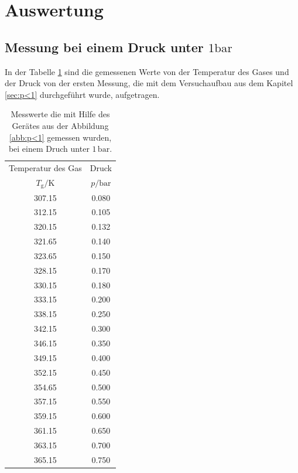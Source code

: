 \section{Auswertung}
\label{sec:Auswertung}
\subsection{Messung bei einem Druck unter $1\si{\bar}$}
In der Tabelle \ref{tab:p<1} sind die gemessenen Werte
von der Temperatur des Gases und der Druck
von der ersten Messung, die mit dem Versuchaufbau aus
dem Kapitel \ref{sec:p<1} durchgeführt wurde, aufgetragen.


\begin{table}  %
  \centering
  \caption{Messwerte die mit Hilfe des Gerätes aus der Abbildung \ref{abb:p<1} gemessen wurden, bei einem Druch unter $1\,\si{\bar}$.}
  \label{tab:p<1}
  \begin{tabular}{c c}
    \toprule
    Temperatur des Gas &  Druck \\
    $T_\mathrm{g}/ \si{\kelvin}$ & $p/\si{\bar} $ \\
    \midrule
    307.15 & 0.080\\
    312.15 & 0.105\\
    320.15 & 0.132\\
    321.65 & 0.140\\
    323.65 & 0.150\\
    328.15 & 0.170\\
    330.15 & 0.180\\
    333.15 & 0.200\\
    338.15 & 0.250\\
    342.15 & 0.300\\
    346.15 & 0.350\\
    349.15 & 0.400\\
    352.15 & 0.450\\
    354.65 & 0.500\\
    357.15 & 0.550\\
    359.15 & 0.600\\
    361.15 & 0.650\\
    363.15 & 0.700\\
    365.15 & 0.750\\
    \bottomrule
  \end{tabular}
\end{table}


